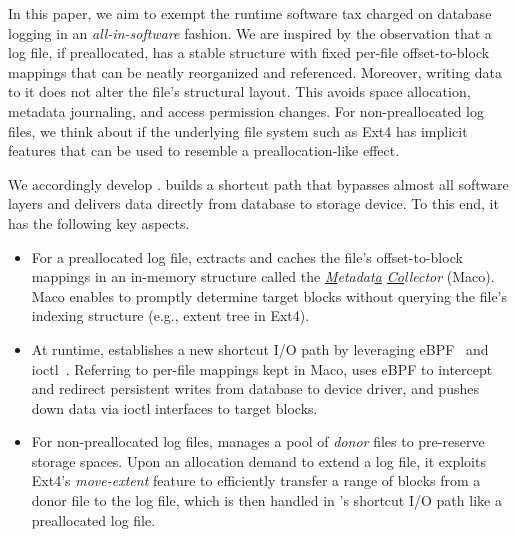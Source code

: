 In this paper, we aim to exempt the runtime software tax charged on
database logging
in an {\em all-in-software} fashion. We are inspired by the observation that a 
 log file, if preallocated, has a stable structure with fixed per-file offset-to-block mappings 
 that can be neatly reorganized and referenced. Moreover,
 writing data to it
  does not alter the file's structural layout. This avoids space  allocation, metadata journaling, 
and access permission changes. 
For non-preallocated log files, we think about if the underlying file system such as Ext4 has implicit 
features that can be used to resemble a preallocation-like effect.

We accordingly develop \odes. \odes builds a shortcut path  that bypasses almost all 
software layers and delivers data directly from database to storage device. 
To this end, it has the following key aspects.
\begin{itemize}[leftmargin=4mm]\setlength{\itemsep}{-\itemsep}
	\item 
	For a preallocated log file,
	\odes extracts and caches the file's offset-to-block mappings 
	in an in-memory structure called the {\em \underline{M}etadat\underline{a} \underline{Co}llector} (Maco). 
	Maco enables \odes to promptly determine target blocks without querying the file's indexing structure (e.g., extent tree in Ext4). 
	\item 
	At runtime, \odes establishes a new shortcut I/O path by leveraging eBPF~\cite{ebpf} 
	and {ioctl}~\cite{ioctlWik84:online}. 
	Referring to per-file mappings kept in Maco, \odes uses eBPF to intercept and redirect 
	persistent writes
	from database to device driver, 
	and pushes down data via ioctl interfaces  to target blocks.
	\item 
	For non-preallocated log files, \odes manages a pool of {\em donor} files to pre-reserve storage spaces.
	Upon an allocation demand to extend a  log file, it exploits Ext4's {\em move-extent} feature \cite{ext4moveextent}
	 to efficiently transfer a range of blocks from a donor file to the log file, which
	is then handled
	in \odes's shortcut I/O path like a preallocated log file. 
\end{itemize}

